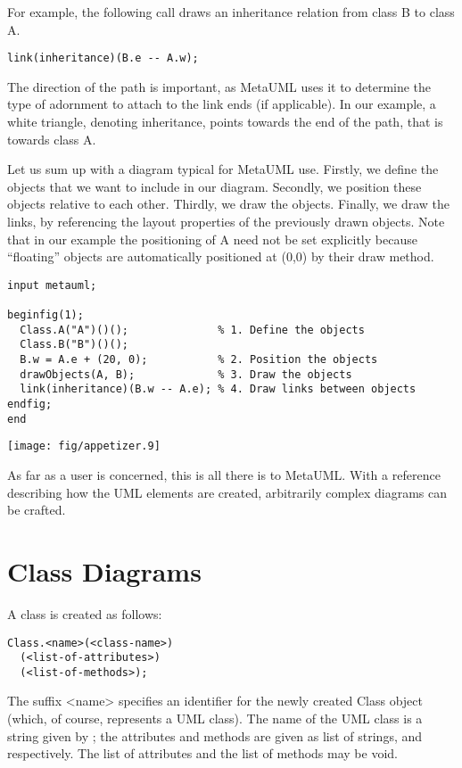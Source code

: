 \documentclass{article}
\newcommand{\code}{\ttfamily}
\begin{document}
For example, the following call draws an inheritance relation from class {\code B} to class {\code A}.

\begin{verbatim}
link(inheritance)(B.e -- A.w);
\end{verbatim}

The direction of the path is important, as MetaUML uses it to determine the
type of adornment to attach to the link ends (if applicable). In our example, a white triangle,
denoting inheritance, points towards the end of the path, that is towards class {\code A}.

Let us sum up with a diagram typical for MetaUML use. Firstly, we define the objects that we want to include
in our diagram. Secondly, we position these objects relative to each other. Thirdly, we draw the objects. Finally, we
draw the links, by referencing the layout properties of the previously drawn objects. Note that in our example the
positioning of {\code A} need not be set explicitly because ``floating'' objects are automatically positioned at 
{\code (0,0)} by their draw method.

\begin{multicols}{2}

\begin{verbatim}
input metauml;

beginfig(1);
  Class.A("A")()();              % 1. Define the objects
  Class.B("B")()();
  B.w = A.e + (20, 0);           % 2. Position the objects
  drawObjects(A, B);             % 3. Draw the objects
  link(inheritance)(B.w -- A.e); % 4. Draw links between objects
endfig;
end
\end{verbatim}
\columnbreak
\texttt{[image: fig/appetizer.9]}
\end{multicols}

As far as a user is concerned, this is all there is to MetaUML. With a reference describing how the
UML elements are created, arbitrarily complex diagrams can be crafted.

\section{Class Diagrams}

A class is created as follows:

\begin{verbatim}
Class.<name>(<class-name>)
  (<list-of-attributes>)
  (<list-of-methods>);
\end{verbatim}

The suffix {\code <name>} specifies an identifier for the newly created {\code Class} object 
(which, of course, represents a UML class).
The name of the UML class is a string given by {\code <class-name>};
the attributes and methods are given as list of strings, {\code <list-of-attributes>} and {\code <list-of-methods>} 
respectively. The list of attributes and the list of methods may be void.
\end{document}
